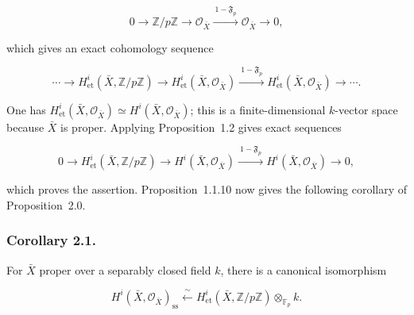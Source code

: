 \begin{equation}\tag{2.0.4}
0\longrightarrow\mathbb Z/p\mathbb Z\longrightarrow\mathcal O_{\bar X}
\xrightarrow{\ 1-\mathfrak F_p\ }\mathcal O_{\bar X}\longrightarrow0,
\end{equation}

which gives an exact cohomology sequence

\begin{equation}\tag{2.0.5}
\cdots\longrightarrow H^i_{\mathrm{et}}(\bar X,\mathbb Z/p\mathbb Z)
\longrightarrow H^i_{\mathrm{et}}(\bar X,\mathcal O_{\bar X})
\xrightarrow{\ 1-\mathfrak F_p\ }
H^i_{\mathrm{et}}(\bar X,\mathcal O_{\bar X})\longrightarrow\cdots .
\end{equation}

One has
$H^i_{\mathrm{et}}(\bar X,\mathcal O_{\bar X})\simeq
H^i(\bar X,\mathcal O_{\bar X})$; this is a finite-dimensional
$k$-vector space because $\bar X$ is proper. Applying Proposition~1.2 gives
exact sequences

\begin{equation}\tag{2.0.6}
0\longrightarrow H^i_{\mathrm{et}}(\bar X,\mathbb Z/p\mathbb Z)
\longrightarrow H^i(\bar X,\mathcal O_{\bar X})
\xrightarrow{\ 1-\mathfrak F_p\ }
H^i(\bar X,\mathcal O_{\bar X})\longrightarrow0,
\end{equation}

which proves the assertion. Proposition~1.1.10 now gives the following
corollary of Proposition~2.0.

\subsubsection*{Corollary 2.1.}
For $\bar X$ proper over a separably closed field $k$, there is a canonical
isomorphism

\begin{equation}\tag{2.1.1}
H^i(\bar X,\mathcal O_{\bar X})_{\mathrm{ss}}
\xleftarrow{\ \sim\ }
H^i_{\mathrm{et}}(\bar X,\mathbb Z/p\mathbb Z)
\otimes_{\mathbb F_p}k.
\end{equation}
